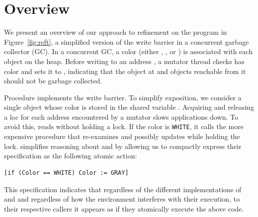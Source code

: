 \section{Overview}
\label{sec:overview}

We present an overview of our approach to refinement on the program in Figure~\ref{fig:reft},
a simplified version of the write barrier in a concurrent garbage collector (GC).
In a concurrent GC, a color (either , , or )
is associated with each object on the heap.  
Before writing to an address , a mutator thread checks 
 has color 
and sets it to , indicating that the object at 
and objects reachable from it should not be garbage collected. 

Procedure  implements the write barrier.
To simplify exposition, 
we consider a single object whose color is stored in the shared variable .
Acquiring and releasing a loc for each address encountered by a
mutator slows applications down. To avoid this, 
 reads  without holding a lock.
If the color is {\tt WHITE}, it calls the more expensive procedure  
that re-examines and possibly updates  while holding the lock.
\civl simplifies reasoning about  and  by allowing us to 
compactly express their specification as the following atomic action:
\begin{verbatim}
[if (Color == WHITE) Color := GRAY]
\end{verbatim}
This specification indicates that regardless of the different implementations of 
 and  and regardless of how the environment interferes
with their execution, to their respective callers it appears as if they atomically execute the above code.


